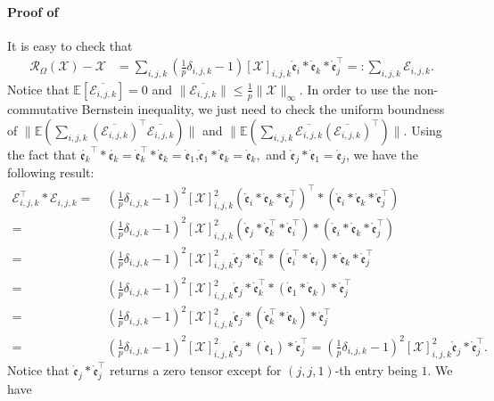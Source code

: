 \documentclass[twoside,12pt]{article}
\def\dme{{\dot{\mathfrak{e}}}}
\def\mrme{{\mathring{\mathfrak{e}}}}
\begin{document}
\paragraph{Proof of }
It is easy to check that 
\begin{align*}
\mathcal{R}_{\Omega}(\mathcal{X})-\mathcal{X}& = \sum\limits_{i,j,k}\left(\frac{1}{p}\delta_{i,j,k}-1\right)[\mathcal{X}]_{i,j,k}\mrme_i * \dme_k * \mrme_j^{\top} =:\sum\limits_{i,j,k}\mathcal{E}_{i,j,k}.
\end{align*}
Notice that $\mathbb{E}[\overline{\mathcal{E}_{i,j,k}}]= 0$ and $\|\overline{\mathcal{E}_{i,j,k}}\|\leq \frac{1}{p}\|\mathcal{X}\|_{\infty}$. In order to use the non-commutative Bernstein inequality, we just need to check the uniform boundness of $\|\mathbb{E}(\sum\limits_{i,j,k}(\overline{\mathcal{E}_{i,j,k}})^{\top}\overline{\mathcal{E}_{i,j,k}})\|$ and $\|\mathbb{E}(\sum\limits_{i,j,k}\overline{\mathcal{E}_{i,j,k}}(\overline{\mathcal{E}_{i,j,k}})^{\top})\|$.
Using the fact that $\mathring{\mathfrak{e}_{k}}^{\top}*\mathring{\mathfrak{e}_{k}} = \dme_{k}^{\top}*\dme_{k}=\dme_{1}$,$\dme_{1}*\dme_{k} = \dme_{k},$ and $\mrme_{j}*\dme_{1} = \mrme_{j}$, we have the following result:
 \begin{align*}
\mathcal{E}_{i,j,k}^{\top}*\mathcal{E}_{i,j,k}
=&~ \left(\frac{1}{p}\delta_{i,j,k} -1\right)^2[\mathcal{X}]_{i,j,k}^2\left(\mrme_i*\dme_k*\mrme_j^{\top}\right)^{\top}*\left(\mrme_i*\dme_k*\mrme_j^{\top}\right) \\
=&~\left(\frac{1}{p}\delta_{i,j,k} -1\right)^2[\mathcal{X}]_{i,j,k}^2\left(\mrme_j*\dme_k^{\top}*\mrme_i^{\top}\right)*\left(\mrme_i*\dme_k*\mrme_j^{\top}\right) \\
=&~\left(\frac{1}{p}\delta_{i,j,k} -1\right)^2[\mathcal{X}]_{i,j,k}^2\mrme_j*\dme_k^{\top}*\left(\mrme_i^{\top}*\mrme_{i}\right)*\dme_k*\mrme_j^{\top} \\
=&~\left(\frac{1}{p}\delta_{i,j,k} -1\right)^2[\mathcal{X}]_{i,j,k}^2\mrme_j*\dme_k^{\top}*\left(\dme_{1}*\dme_k \right)*\mrme_j^{\top} \\
=&~\left(\frac{1}{p}\delta_{i,j,k} -1\right)^2[\mathcal{X}]_{i,j,k}^2\mrme_j*\left(\dme_{k}^{\top}*\dme_k \right)*\mrme_j^{\top}  \\
=&~\left(\frac{1}{p}\delta_{i,j,k} -1\right)^2[\mathcal{X}]_{i,j,k}^2\mrme_j*\left(\dme_
{1}\right)*\mrme_j^{\top}
=\left(\frac{1}{p}\delta_{i,j,k} -1\right)^2[\mathcal{X}]_{i,j,k}^2\mrme_j*\mrme_j^{\top}.
\end{align*}
Notice that $\mrme_j*\mrme_j^{\top}$ returns a zero tensor except for $(j,j,1)$-th entry being $1$. We have
\end{document}
